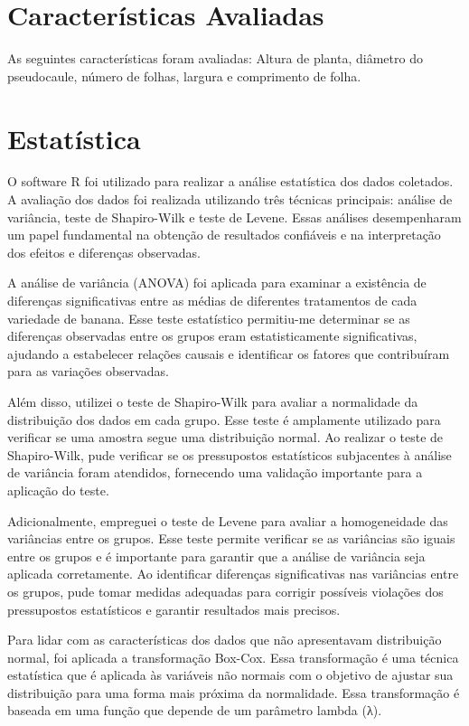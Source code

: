 \section{Características Avaliadas}
As seguintes características foram avaliadas: Altura de planta, diâmetro do pseudocaule, número de folhas, largura e comprimento de folha.

\section{Estatística}
O software R foi utilizado para realizar a análise estatística dos dados coletados. A avaliação dos dados foi realizada utilizando três técnicas principais: análise de variância, teste de Shapiro-Wilk e teste de Levene. Essas análises desempenharam um papel fundamental na obtenção de resultados confiáveis e na interpretação dos efeitos e diferenças observadas.

A análise de variância (ANOVA) foi aplicada para examinar a existência de diferenças significativas entre as médias de diferentes tratamentos de cada variedade de banana. Esse teste estatístico permitiu-me determinar se as diferenças observadas entre os grupos eram estatisticamente significativas, ajudando a estabelecer relações causais e identificar os fatores que contribuíram para as variações observadas.

Além disso, utilizei o teste de Shapiro-Wilk para avaliar a normalidade da distribuição dos dados em cada grupo. Esse teste é amplamente utilizado para verificar se uma amostra segue uma distribuição normal. Ao realizar o teste de Shapiro-Wilk, pude verificar se os pressupostos estatísticos subjacentes à análise de variância foram atendidos, fornecendo uma validação importante para a aplicação do teste.

Adicionalmente, empreguei o teste de Levene para avaliar a homogeneidade das variâncias entre os grupos. Esse teste permite verificar se as variâncias são iguais entre os grupos e é importante para garantir que a análise de variância seja aplicada corretamente. Ao identificar diferenças significativas nas variâncias entre os grupos, pude tomar medidas adequadas para corrigir possíveis violações dos pressupostos estatísticos e garantir resultados mais precisos.

Para lidar com as características dos dados que não apresentavam distribuição normal, foi aplicada a transformação Box-Cox. Essa transformação é uma técnica estatística que é aplicada às variáveis não normais com o objetivo de ajustar sua distribuição para uma forma mais próxima da normalidade. Essa transformação é baseada em uma função que depende de um parâmetro lambda (λ).